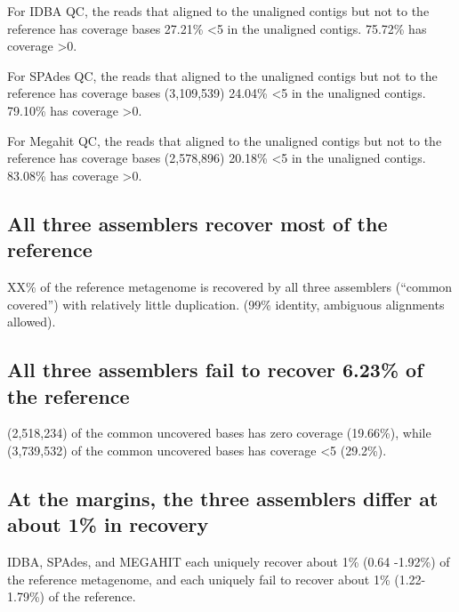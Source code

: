 \documentclass[10pt,a4paper,twocolumn]{article}
\begin{document}
 

For IDBA QC, the reads that aligned to the unaligned contigs but not to the reference has coverage bases 27.21\% \textless 5 in the unaligned contigs. 75.72\% 
has coverage \textgreater 0.

For SPAdes QC, the reads that aligned to the unaligned contigs but not to the reference has coverage bases (3,109,539) 24.04\% \textless 5 in the unaligned contigs. 79.10\% has coverage \textgreater 0.

For Megahit QC, the reads that aligned to the unaligned contigs but not to the reference has coverage bases (2,578,896) 20.18\% \textless 5 in the unaligned contigs. 83.08\% has coverage \textgreater 0. 

 

\subsection*{All three assemblers recover most of the reference}


XX\% of the reference metagenome is recovered by all three assemblers (“common covered”) with relatively little duplication. (99\% identity, ambiguous alignments allowed).
 
\subsection*{All three assemblers fail to recover 6.23\%  of the reference}
  

(2,518,234) of the common uncovered bases has zero coverage (19.66\%), while (3,739,532) of the common uncovered bases has coverage \textless 5 (29.2\%). 

\subsection*{At the margins, the three assemblers differ at about 1\% in recovery}
IDBA, SPAdes, and MEGAHIT each uniquely recover about 1\% (0.64
-1.92\%) of the reference metagenome, and each uniquely fail to recover about 1\% (1.22-1.79\%) of the reference.
\end{document}
